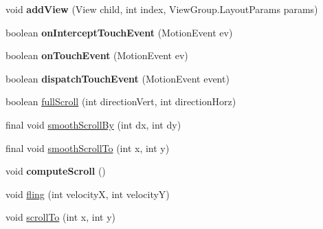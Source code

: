 \begin{DoxyCompactItemize}
\mbox{\label{classcom_1_1example_1_1victorardianto_1_1myapplication_1_1widget_1_1_two_d_scroll_view_a5d1187b09eabb379c3deaa5b10e0d855}} 
void {\bfseries add\+View} (View child, int index, View\+Group.\+Layout\+Params params)
\item 
\mbox{\label{classcom_1_1example_1_1victorardianto_1_1myapplication_1_1widget_1_1_two_d_scroll_view_abb1bd8064392222729ca349472e0d517}} 
boolean {\bfseries on\+Intercept\+Touch\+Event} (Motion\+Event ev)
\item 
\mbox{\label{classcom_1_1example_1_1victorardianto_1_1myapplication_1_1widget_1_1_two_d_scroll_view_a5f76d2b9f4ff2c531dec46d392f54f56}} 
boolean {\bfseries on\+Touch\+Event} (Motion\+Event ev)
\item 
\mbox{\label{classcom_1_1example_1_1victorardianto_1_1myapplication_1_1widget_1_1_two_d_scroll_view_a838e56db5346f3e5201813ff5a49d1ef}} 
boolean {\bfseries dispatch\+Touch\+Event} (Motion\+Event event)
\item 
boolean \mbox{\hyperlink{classcom_1_1example_1_1victorardianto_1_1myapplication_1_1widget_1_1_two_d_scroll_view_ac45fa20d597559082c6f82d1844a1ab4}{full\+Scroll}} (int direction\+Vert, int direction\+Horz)
\item 
final void \mbox{\hyperlink{classcom_1_1example_1_1victorardianto_1_1myapplication_1_1widget_1_1_two_d_scroll_view_a561a87cd44470281e3a2e599ea3efa17}{smooth\+Scroll\+By}} (int dx, int dy)
\item 
final void \mbox{\hyperlink{classcom_1_1example_1_1victorardianto_1_1myapplication_1_1widget_1_1_two_d_scroll_view_abdab45c3d2e7d2101ba37346cfac3efc}{smooth\+Scroll\+To}} (int x, int y)
\item 
\mbox{\label{classcom_1_1example_1_1victorardianto_1_1myapplication_1_1widget_1_1_two_d_scroll_view_a958257f2f200e9ff843fe86f12a06070}} 
void {\bfseries compute\+Scroll} ()
\item 
void \mbox{\hyperlink{classcom_1_1example_1_1victorardianto_1_1myapplication_1_1widget_1_1_two_d_scroll_view_a4f379153b2755cf5fa764fc8f224322e}{fling}} (int velocityX, int velocityY)
\item 
void \mbox{\hyperlink{classcom_1_1example_1_1victorardianto_1_1myapplication_1_1widget_1_1_two_d_scroll_view_a2178f482b96f9c80010ec5ae0f9822a7}{scroll\+To}} (int x, int y)
\end{DoxyCompactItemize}
